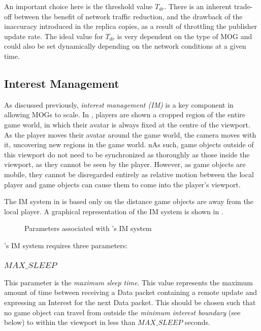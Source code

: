 An important choice here is the threshold value $T_{dr}$. There is an inherent trade-off between the benefit of network traffic reduction, and the drawback of the inaccuracy introduced in the replica copies, as a result of throttling the publisher update rate. The ideal value for $T_{dr}$ is very dependent on the type of MOG and could also be set dynamically depending on the network conditions at a given time.


\subsection{Interest Management}\label{sec:des:im}
As discussed previously, \textit{interest management (IM)} is a key component in allowing MOGs to scale. In \game{}, players are shown a cropped region of the entire game world, in which their avatar is always fixed at the centre of the viewport. As the player moves their avatar around the game world, the camera moves with it, uncovering new regions in the game world. nAs such, game objects outside of this viewport do not need to be synchronized as thoroughly as those inside the viewport, as they cannot be seen by the player. However, as game objects are mobile, they cannot be disregarded entirely as relative motion between the local player and game objects can cause them to come into the player's viewport. 

The IM system in \game{} is based only on the distance game objects are away from the local player. A graphical representation of the IM system is shown in .

\begin{figure}[H]
    \centering
    \caption{Parameters associated with \game{}'s IM system}
    \label{fig:des:interest-regions}
\end{figure}

\game{}'s IM system requires three parameters:
\subsubsection{$MAX\_SLEEP$}
This parameter is the \textit{maximum sleep time}. This value represents the maximum amount of time between receiving a Data packet containing a remote update and expressing an Interest for the next Data packet. This should be chosen such that no game object can travel from outside the \textit{minimum interest boundary} (see below) to within the viewport in less than $MAX\_SLEEP$ seconds. 

